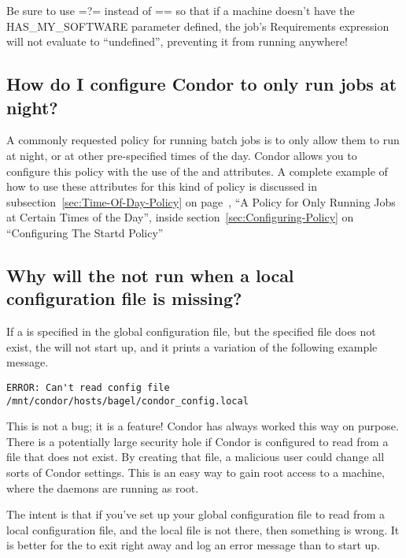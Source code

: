 \Note Be sure to use =?= instead of == so that if a machine doesn't have
the HAS\_MY\_SOFTWARE parameter defined, the job's Requirements
expression will not evaluate to ``undefined'', preventing it from
running anywhere!


\subsection{How do I configure Condor to only run jobs at night?}

A commonly requested policy for running batch jobs is to only allow
them to run at night, or at other pre-specified times of the day.
Condor allows you to configure this policy with the use of the
 and   attributes.  
A complete example of how to use these attributes for this kind of
policy is discussed in subsection~\ref{sec:Time-Of-Day-Policy} on
page~\pageref{sec:Time-Of-Day-Policy}, ``A Policy for Only Running
Jobs at Certain Times of the Day'', inside
section~\ref{sec:Configuring-Policy} on ``Configuring The Startd
Policy''


\subsection{Why will the  not run when a local
configuration file is missing?}

If a  
is specified in the global configuration file,
but the specified file does not exist,
the  will not start up, and it prints a variation
of the following example message.

\begin{verbatim}
ERROR: Can't read config file /mnt/condor/hosts/bagel/condor_config.local
\end{verbatim}

This is not a bug; it is a feature!
Condor has always worked this way on purpose.
There is a potentially
large security hole if Condor is configured to read from a file that
does not exist.
By creating that file, a malicious user could
change all sorts of Condor settings.
This is an easy way
to gain root access to a machine,
where the daemons are running as root.

The intent is that
if you've set up your global configuration file to read
from a local configuration file, and the local file is not there,
then something is wrong.
It is better for the  to exit right away and
log an error message than to start up.

